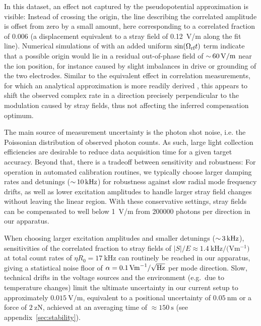 \documentclass[pra,twocolumn]{revtex4-2}
\begin{document}
In this dataset, an effect not captured by the pseudopotential approximation is visible:
Instead of crossing the origin, the line describing the correlated amplitude is offset from zero by a small amount, here corresponding to a correlated fraction of \num{0.006} (a displacement equivalent to a stray field of \SI{0.12}{\volt / \metre} along the fit line).
Numerical simulations of  with an added uniform $\sin(\Omega_{\textrm{rf}} t)$ term indicate that a possible origin would lie in a residual out-of-phase \RF{} field of $\mbox{$\sim$}\, \SI{60}{\volt / \metre}$ near the ion position, for instance caused by slight imbalances in drive or grounding of the two \RF{} electrodes.
Similar to the equivalent effect in \RF{} correlation measurements, for which an analytical approximation is more readily derived \cite{berkelandMinimizationIonMicromotion1998,kellerPreciseDeterminationMicromotion2015}, this appears to shift the observed complex rate in a direction precisely perpendicular to the modulation caused by stray \DC{} fields, thus not affecting the inferred compensation optimum.

The main source of measurement uncertainty is the photon shot noise, i.e. the Poissonian distribution of observed photon counts.
As such, large light collection efficiencies are desirable to reduce data acquisition time for a given target accuracy.
Beyond that, there is a tradeoff between sensitivity and robustness:
For operation in automated calibration routines, we typically choose larger damping rates and detunings ($\mbox{$\sim$}\, \SI{10}{\kilo\hertz}$) for robustness against slow radial mode frequency drifts, as well as lower excitation amplitudes to handle larger stray field changes without leaving the linear region.
With these conservative settings, stray fields can be compensated to well below \SI{1}{\volt/\metre} from \num{200000} photons per direction in our apparatus.

When choosing larger excitation amplitudes and smaller detunings ($\mbox{$\sim$}\, \SI{3}{\kilo\hertz}$), sensitivities of the correlated fraction to stray fields of $|S| / E \approx \SI{1.4}{\kilo\hertz/ (\volt \metre^{-1})}$ at total count rates of $\eta R_0 = \SI{17}{\kilo\hertz}$ can routinely be reached in our apparatus, giving a statistical noise floor of $\alpha = \SI{0.1}{V m^{-1} / \sqrt{\hertz}}$ per mode direction.
Slow, technical drifts in the voltage sources and the environment (e.g.~due to temperature changes) limit the ultimate uncertainty in our current setup to approximately $\SI{0.015}{\volt / \metre}$, equivalent to a positional uncertainty of $\SI{0.05}{\nano\metre}$ or a force of $\SI{2}{\zepto\newton}$, achieved at an averaging time of $\approx \SI{150}{\second}$ (see appendix~\ref{sec:stability}).
\end{document}
